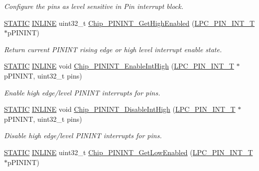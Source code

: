 \begin{DoxyCompactItemize}
\begin{DoxyCompactList}\small\item\em Configure the pins as level sensitive in Pin interrupt block. \end{DoxyCompactList}\item 
\hyperlink{group___l_p_c___types___public___macros_ga10b2d890d871e1489bb02b7e70d9bdfb}{S\+T\+A\+T\+IC} \hyperlink{spifi__18xx__43xx_8h_a2eb6f9e0395b47b8d5e3eeae4fe0c116}{I\+N\+L\+I\+NE} uint32\+\_\+t \hyperlink{group___p_i_n_i_n_t__18_x_x__43_x_x_ga25520f739f79f23c523c02cc8376dc94}{Chip\+\_\+\+P\+I\+N\+I\+N\+T\+\_\+\+Get\+High\+Enabled} (\hyperlink{struct_l_p_c___p_i_n___i_n_t___t}{L\+P\+C\+\_\+\+P\+I\+N\+\_\+\+I\+N\+T\+\_\+T} $\ast$p\+P\+I\+N\+I\+NT)
\begin{DoxyCompactList}\small\item\em Return current P\+I\+N\+I\+NT rising edge or high level interrupt enable state. \end{DoxyCompactList}\item 
\hyperlink{group___l_p_c___types___public___macros_ga10b2d890d871e1489bb02b7e70d9bdfb}{S\+T\+A\+T\+IC} \hyperlink{spifi__18xx__43xx_8h_a2eb6f9e0395b47b8d5e3eeae4fe0c116}{I\+N\+L\+I\+NE} void \hyperlink{group___p_i_n_i_n_t__18_x_x__43_x_x_gaeb6881b3447233e72edca9abd87e8f13}{Chip\+\_\+\+P\+I\+N\+I\+N\+T\+\_\+\+Enable\+Int\+High} (\hyperlink{struct_l_p_c___p_i_n___i_n_t___t}{L\+P\+C\+\_\+\+P\+I\+N\+\_\+\+I\+N\+T\+\_\+T} $\ast$p\+P\+I\+N\+I\+NT, uint32\+\_\+t pins)
\begin{DoxyCompactList}\small\item\em Enable high edge/level P\+I\+N\+I\+NT interrupts for pins. \end{DoxyCompactList}\item 
\hyperlink{group___l_p_c___types___public___macros_ga10b2d890d871e1489bb02b7e70d9bdfb}{S\+T\+A\+T\+IC} \hyperlink{spifi__18xx__43xx_8h_a2eb6f9e0395b47b8d5e3eeae4fe0c116}{I\+N\+L\+I\+NE} void \hyperlink{group___p_i_n_i_n_t__18_x_x__43_x_x_ga9e337046dac41a61cfcfaa4059b403a9}{Chip\+\_\+\+P\+I\+N\+I\+N\+T\+\_\+\+Disable\+Int\+High} (\hyperlink{struct_l_p_c___p_i_n___i_n_t___t}{L\+P\+C\+\_\+\+P\+I\+N\+\_\+\+I\+N\+T\+\_\+T} $\ast$p\+P\+I\+N\+I\+NT, uint32\+\_\+t pins)
\begin{DoxyCompactList}\small\item\em Disable high edge/level P\+I\+N\+I\+NT interrupts for pins. \end{DoxyCompactList}\item 
\hyperlink{group___l_p_c___types___public___macros_ga10b2d890d871e1489bb02b7e70d9bdfb}{S\+T\+A\+T\+IC} \hyperlink{spifi__18xx__43xx_8h_a2eb6f9e0395b47b8d5e3eeae4fe0c116}{I\+N\+L\+I\+NE} uint32\+\_\+t \hyperlink{group___p_i_n_i_n_t__18_x_x__43_x_x_gab1378b396f6d1ba5a192153b40504353}{Chip\+\_\+\+P\+I\+N\+I\+N\+T\+\_\+\+Get\+Low\+Enabled} (\hyperlink{struct_l_p_c___p_i_n___i_n_t___t}{L\+P\+C\+\_\+\+P\+I\+N\+\_\+\+I\+N\+T\+\_\+T} $\ast$p\+P\+I\+N\+I\+NT)

\end{DoxyCompactItemize}
